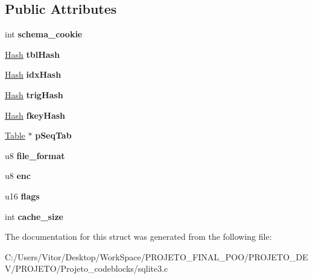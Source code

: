 \subsection*{Public Attributes}
\begin{DoxyCompactItemize}
\item 
\hypertarget{struct_schema_a3eef54a64f4f962d64577646bd34a47c}{int {\bfseries schema\-\_\-cookie}}\label{struct_schema_a3eef54a64f4f962d64577646bd34a47c}

\item 
\hypertarget{struct_schema_af841eadc93b289944b95f72b784bfaae}{\hyperlink{struct_hash}{Hash} {\bfseries tbl\-Hash}}\label{struct_schema_af841eadc93b289944b95f72b784bfaae}

\item 
\hypertarget{struct_schema_ac0dd242f486d17ddadca1e47af76c6c5}{\hyperlink{struct_hash}{Hash} {\bfseries idx\-Hash}}\label{struct_schema_ac0dd242f486d17ddadca1e47af76c6c5}

\item 
\hypertarget{struct_schema_ab521f4545d200329d8e1a46bbb67e7c5}{\hyperlink{struct_hash}{Hash} {\bfseries trig\-Hash}}\label{struct_schema_ab521f4545d200329d8e1a46bbb67e7c5}

\item 
\hypertarget{struct_schema_ad51ed96351701cfe8d9e871722827c11}{\hyperlink{struct_hash}{Hash} {\bfseries fkey\-Hash}}\label{struct_schema_ad51ed96351701cfe8d9e871722827c11}

\item 
\hypertarget{struct_schema_ad580e4e662724bee95571d297f94da37}{\hyperlink{struct_table}{Table} $\ast$ {\bfseries p\-Seq\-Tab}}\label{struct_schema_ad580e4e662724bee95571d297f94da37}

\item 
\hypertarget{struct_schema_ab9f0371436e41b3080772995407a4cca}{u8 {\bfseries file\-\_\-format}}\label{struct_schema_ab9f0371436e41b3080772995407a4cca}

\item 
\hypertarget{struct_schema_a1338d09fe9cbb5a8162929202cb73cae}{u8 {\bfseries enc}}\label{struct_schema_a1338d09fe9cbb5a8162929202cb73cae}

\item 
\hypertarget{struct_schema_a14838766a0a438e590a27f300beff459}{u16 {\bfseries flags}}\label{struct_schema_a14838766a0a438e590a27f300beff459}

\item 
\hypertarget{struct_schema_a0a66691be95a30c099ca4840da7110dd}{int {\bfseries cache\-\_\-size}}\label{struct_schema_a0a66691be95a30c099ca4840da7110dd}

\end{DoxyCompactItemize}


The documentation for this struct was generated from the following file\-:\begin{DoxyCompactItemize}
\item 
C\-:/\-Users/\-Vitor/\-Desktop/\-Work\-Space/\-P\-R\-O\-J\-E\-T\-O\-\_\-\-F\-I\-N\-A\-L\-\_\-\-P\-O\-O/\-P\-R\-O\-J\-E\-T\-O\-\_\-\-D\-E\-V/\-P\-R\-O\-J\-E\-T\-O/\-Projeto\-\_\-codeblocks/sqlite3.\-c\end{DoxyCompactItemize}
